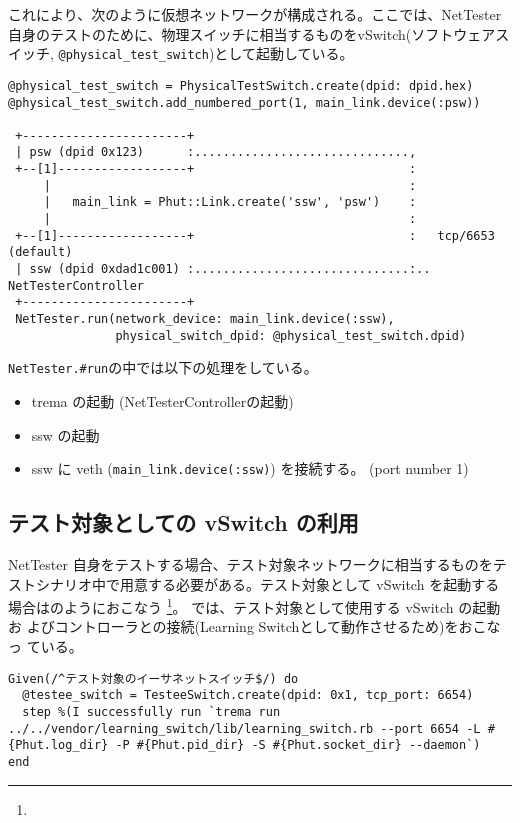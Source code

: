 これにより、次のように仮想ネットワークが構成される。ここでは、NetTester
自身のテストのために、物理スイッチに相当するものをvSwitch(ソフトウェアス
イッチ, \verb|@physical_test_switch|)として起動している。

\begin{textbox}
\begin{verbatim}
@physical_test_switch = PhysicalTestSwitch.create(dpid: dpid.hex)
@physical_test_switch.add_numbered_port(1, main_link.device(:psw))

 +-----------------------+
 | psw (dpid 0x123)      :..............................,
 +--[1]------------------+                              :
     |                                                  :
     |   main_link = Phut::Link.create('ssw', 'psw')    :
     |                                                  :
 +--[1]------------------+                              :   tcp/6653 (default)
 | ssw (dpid 0xdad1c001) :..............................:.. NetTesterController
 +-----------------------+
 NetTester.run(network_device: main_link.device(:ssw),
               physical_switch_dpid: @physical_test_switch.dpid)
\end{verbatim}
\end{textbox}

\verb|NetTester.#run|の中では以下の処理をしている。

\begin{itemize}
 \item trema の起動 (NetTesterControllerの起動)
 \item ssw の起動
 \item ssw に veth (\verb|main_link.device(:ssw)|) を接続する。
       (port number 1)
\end{itemize}

\subsection{テスト対象としての vSwitch の利用}

NetTester 自身をテストする場合、テスト対象ネットワークに相当するものをテ
ストシナリオ中で用意する必要がある。テスト対象として vSwitch を起動する
場合はのようにおこなう
\footnote{}。
では、テスト対象として使用する vSwitch の起動お
よびコントローラとの接続(Learning Switchとして動作させるため)をおこなっ
ている。

\begin{lstlisting}[caption=vSwitchの起動,label=lst:run-vswitch]
Given(/^テスト対象のイーサネットスイッチ$/) do
  @testee_switch = TesteeSwitch.create(dpid: 0x1, tcp_port: 6654)
  step %(I successfully run `trema run ../../vendor/learning_switch/lib/learning_switch.rb --port 6654 -L #{Phut.log_dir} -P #{Phut.pid_dir} -S #{Phut.socket_dir} --daemon`)
end
\end{lstlisting}

